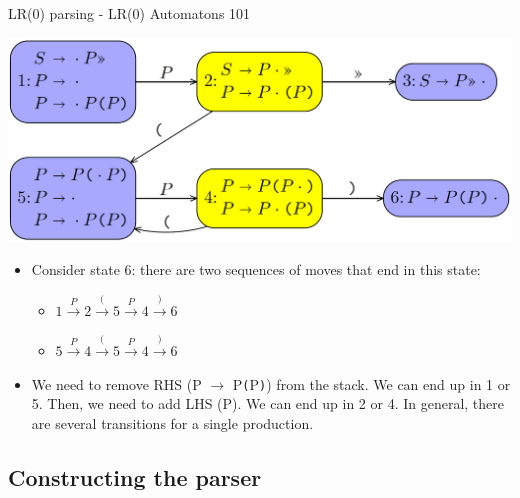 \documentclass[10pt]{beamer}
\begin{document}
\begin{frame}[fragile]{LR(0) parsing - LR(0) Automatons 101}

\begin{center}
\includegraphics[scale=0.18]{lr0-automaton.png}
\end{center}

\begin{itemize}

\item Consider state 6: there are two sequences of moves that end in this state:
\begin{itemize}
\item $1 \xrightarrow{P}2 \xrightarrow{(}5 \xrightarrow{P}4 \xrightarrow{)}6$
\item $5 \xrightarrow{P}4 \xrightarrow{(}5 \xrightarrow{P}4 \xrightarrow{)}6$
\end{itemize}

\item We need to remove RHS (P $\rightarrow$ P\texttt{(}P\texttt{)}) from the stack. We can end up in 1 or 5. Then, we need to add LHS (P). We can end up in 2 or 4. In general, there are several transitions for a single production.

\end{itemize}

\end{frame}

\subsection{Constructing the parser}
\end{document}
